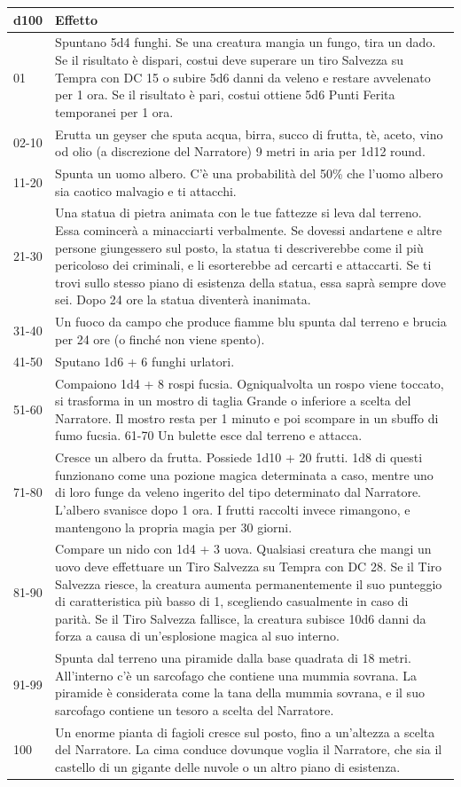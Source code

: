 \begin{tabularx}{0.95\textwidth}{lX}
\textbf{d100} & \textbf{Effetto}\\
\hline
01 &Spuntano 5d4 funghi. Se una creatura mangia un fungo, tira un dado. Se il risultato è dispari, costui deve superare un tiro Salvezza su Tempra con DC 15 o subire 5d6 danni da veleno e restare avvelenato per 1 ora. Se il risultato è pari, costui ottiene 5d6 Punti Ferita temporanei per 1 ora.\\
02-10 &Erutta un geyser che sputa acqua, birra, succo di frutta, tè, aceto, vino od olio (a discrezione del Narratore) 9 metri in aria per 1d12 round.\\
11-20 &Spunta un uomo albero. C'è una probabilità del 50\% che l'uomo albero sia caotico malvagio e ti attacchi.\\
21-30 &Una statua di pietra animata con le tue fattezze si leva dal terreno. Essa comincerà a minacciarti verbalmente. Se dovessi andartene e altre persone giungessero sul posto, la statua ti descriverebbe come il più pericoloso dei criminali, e li esorterebbe ad cercarti e attaccarti. Se ti trovi sullo stesso piano di esistenza della statua, essa saprà sempre dove sei. Dopo 24 ore la statua diventerà inanimata.\\
31-40 &Un fuoco da campo che produce fiamme blu spunta dal terreno e brucia per 24 ore (o finché non viene spento).\\
41-50 &Sputano 1d6 + 6 funghi urlatori.\\
51-60 &Compaiono 1d4 + 8 rospi fucsia. Ogniqualvolta un rospo viene toccato, si trasforma in un mostro di taglia Grande o inferiore a scelta del Narratore. Il mostro resta per 1 minuto e poi scompare in un sbuffo di fumo fucsia. 61-70 Un bulette esce dal terreno e attacca.\\
71-80 &Cresce un albero da frutta. Possiede 1d10 + 20 frutti. 1d8 di questi funzionano come una pozione magica determinata a caso, mentre uno di loro funge da veleno ingerito del tipo determinato dal Narratore. L'albero svanisce dopo 1 ora. I frutti raccolti invece rimangono, e mantengono la propria magia per 30 giorni. \\
81-90 &Compare un nido con 1d4 + 3 uova. Qualsiasi creatura che mangi un uovo deve effettuare un Tiro Salvezza su Tempra con DC 28. Se il Tiro Salvezza riesce, la
creatura aumenta permanentemente il suo punteggio di caratteristica più basso di 1, scegliendo casualmente in caso di parità. Se il Tiro Salvezza fallisce, la creatura subisce 10d6 danni da forza a causa di un'esplosione magica al suo interno.\\
91-99 &Spunta dal terreno una piramide dalla base quadrata di 18 metri. All'interno c'è un sarcofago che contiene una mummia sovrana. La piramide è considerata come la tana della mummia sovrana, e il suo sarcofago contiene un tesoro a scelta del Narratore.\\
100 &Un enorme pianta di fagioli cresce sul posto, fino a un'altezza a scelta del Narratore. La cima conduce dovunque voglia il Narratore, che sia il castello di un gigante delle nuvole o un altro piano di esistenza.
\end{tabularx}

